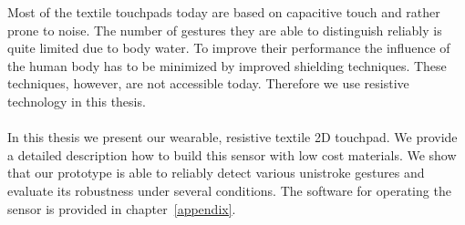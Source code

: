Most of the textile touchpads today are based on capacitive touch and rather prone to noise. The number of gestures they are able to distinguish reliably is quite limited due to body water. To improve their performance the influence of the human body has to be minimized by improved shielding techniques. These techniques, however, are not accessible today.  Therefore we use resistive technology in this thesis.\\ \\
In this thesis we present our wearable, resistive textile 2D touchpad. We provide a detailed description how to build this sensor with low cost materials. We show that our prototype is able to reliably detect various unistroke gestures and evaluate its robustness under several conditions. The software for operating the sensor is provided in chapter~\ref{appendix}.
